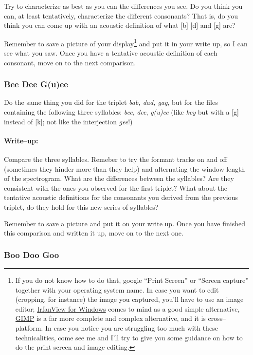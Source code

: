 \documentclass{article}
\begin{document}
Try to characterize as best as you can the differences you see. Do you think you can, at least tentatively, characterize the different consonants? That is, do you think you can come up with an acoustic definition of what [b] [d] and [g] are?

Remember to save a picture of your display\footnote{If you do not know how to do that, google ``Print Screen'' or ``Screen capture'' together with your operating system name. In case you want to edit (cropping, for instance) the image you captured, you'll have to use an image editor; \href{http://www.irfanview.com/}{IrfanView for Windows} comes to mind as a good simple alternative, \href{http://www.gimp.org/}{GIMP} is a far more complete and complex alternative, and it is cross--platform. In case you notice you are struggling too much with these technicalities, come see me and I'll try to give you some guidance on how to do the print screen and image editing.} and put it in your write up, so I can see what you saw. Once you have a tentative acoustic definition of each consonant, move on to the next comparison.

\subsubsection{Bee Dee G(u)ee}

Do the same thing you did for the triplet \emph{bab, dad, gag}, but for the files containing the following three syllables: \emph{bee}, \emph{dee}, \emph{g(u)ee} (like \emph{key} but with a [g] instead of [k]; not like the interjection \emph{gee}!)

\paragraph{Write--up:} Compare the three syllables. Remeber to try the formant tracks on and off (sometimes they hinder more than they help) and alternating the window length of the spectrogram. What are the differences between the syllables? Are they consistent with the ones you observed for the first triplet? What about the tentative acoustic definitions for the consonants you derived from the previous triplet, do they hold for this new series of syllables?

Remember to save a picture and put it on your write up. Once you have finished this comparison and written it up, move on to the next one.

\subsubsection{Boo Doo Goo}
\end{document}
